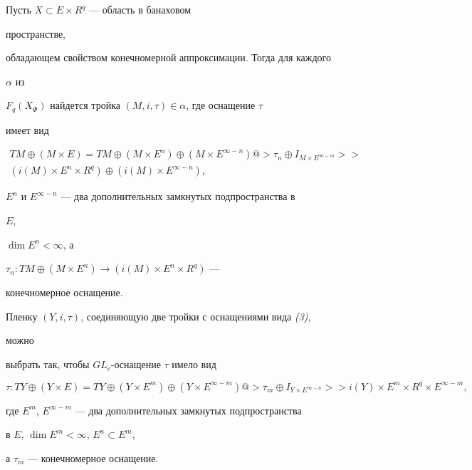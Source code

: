 \begin{thm} Пусть $X\subset E\times R^q$ --- область в банаховом 


пространстве, 


обладающем свойством конечномерной аппроксимации. Тогда для каждого 


$\alpha$ из 


$F_q(X_\Phi)$ найдется тройка $(M,i,\tau)\in\alpha$, где оснащение $\tau$ 


имеет вид 


\begin{multline} 


TM\oplus(M\times E)=TM\oplus(M\times E^n)\oplus 


(M\times E^{\infty-n})@>{\tau_n\oplus I_{M\times E^{\infty-m}}}>> \\


%


(i(M)\times E^n\times R^q)\oplus(i(M)\times E^{\infty-n}), 


\end{multline} 


$E^n$ и $E^{\infty-n}$ --- два дополнительных замкнутых подпространства в 


$E$, 


$\dim E^n<\infty$, а 


$\tau_n:TM\oplus(M\times E^n)\to(i(M)\times E^n\times R^q)$ --- 


конечномерное оснащение. 


Пленку $(Y,i,\tau)$, соединяющую две тройки с оснащениями вида {\em (3)}, 


можно 


выбрать так, чтобы $GL_c$-оснащение $\tau$ имело вид 


$$ 


\tau:TY\oplus(Y\times E)=TY\oplus(Y\times E^m)\oplus 


(Y\times E^{\infty-m}) 


@>{\tau_m\oplus I_{Y\times E^{\infty-n}}}>>i(Y)\times E^m 


\times R^q\times E^{\infty-m}, 


$$ 


где $E^m$, $E^{\infty-m}$ --- два дополнительных замкнутых подпространства 


в $E$, $\dim E^m<\infty$, $E^n\subset E^m$, 


а $\tau_m$ --- конечномерное оснащение. 


\end{thm} 


